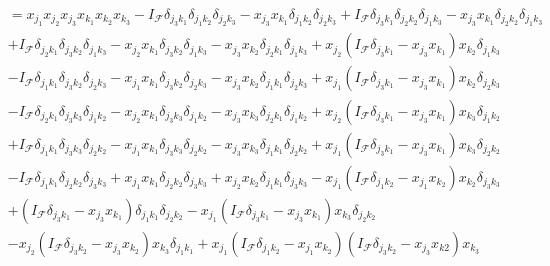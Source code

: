 \documentclass[aps,preprint]{revtex4}%
\begin{document}
\begin{align}
&  =x_{j_{1}}x_{j_{2}}x_{j_{3}}x_{k_{1}}x_{k_{2}}x_{k_{3}}-I_{\mathcal{F}%
}\delta_{j_{3}k_{1}}\delta_{j_{1}k_{2}}\delta_{j_{2}k_{3}}-x_{j_{3}}x_{k_{1}%
}\delta_{j_{1}k_{2}}\delta_{j_{2}k_{3}}+I_{\mathcal{F}}\delta_{j_{3}k_{1}%
}\delta_{j_{2}k_{2}}\delta_{j_{1}k_{3}}-x_{j_{3}}x_{k_{1}}\delta_{j_{2}k_{2}%
}\delta_{j_{1}k_{3}}\nonumber\\
&  +I_{\mathcal{F}}\delta_{j_{2}k_{1}}\delta_{j_{3}k_{2}}\delta_{j_{1}k_{3}%
}-x_{j_{2}}x_{k_{1}}\delta_{j_{3}k_{2}}\delta_{j_{1}k_{3}}-x_{j_{3}}x_{k_{2}%
}\delta_{j_{2}k_{1}}\delta_{j_{1}k_{3}}+x_{j_{2}}\left(  I_{\mathcal{F}}%
\delta_{j_{3}k_{1}}-x_{j_{3}}x_{k_{1}}\right)  x_{k_{2}}\delta_{j_{1}k_{3}%
}\nonumber\\
&  -I_{\mathcal{F}}\delta_{j_{1}k_{1}}\delta_{j_{3}k_{2}}\delta_{j_{2}k_{3}%
}-x_{j_{1}}x_{k_{1}}\delta_{j_{3}k_{2}}\delta_{j_{2}k_{3}}-x_{j_{3}}x_{k_{2}%
}\delta_{j_{1}k_{1}}\delta_{j_{2}k_{3}}+x_{j_{1}}\left(  I_{\mathcal{F}}%
\delta_{j_{3}k_{1}}-x_{j_{3}}x_{k_{1}}\right)  x_{k_{2}}\delta_{j_{2}k_{3}%
}\nonumber\\
&  -I_{\mathcal{F}}\delta_{j_{2}k_{1}}\delta_{j_{3}k_{3}}\delta_{j_{1}k_{2}%
}-x_{j_{2}}x_{k_{1}}\delta_{j_{3}k_{3}}\delta_{j_{1}k_{2}}-x_{j_{3}}x_{k_{3}%
}\delta_{j_{2}k_{1}}\delta_{j_{1}k_{2}}+x_{j_{2}}\left(  I_{\mathcal{F}}%
\delta_{j_{3}k_{1}}-x_{j_{3}}x_{k_{1}}\right)  x_{k_{3}}\delta_{j_{1}k_{2}%
}\nonumber\\
&  +I_{\mathcal{F}}\delta_{j_{1}k_{1}}\delta_{j_{3}k_{3}}\delta_{j_{2}k_{2}%
}-x_{j_{1}}x_{k_{1}}\delta_{j_{3}k_{3}}\delta_{j_{2}k_{2}}-x_{j_{3}}x_{k_{3}%
}\delta_{j_{1}k_{1}}\delta_{j_{2}k_{2}}+x_{j_{1}}\left(  I_{\mathcal{F}}%
\delta_{j_{3}k_{1}}-x_{j_{3}}x_{k_{1}}\right)  x_{k_{3}}\delta_{j_{2}k_{2}%
}\nonumber\\
&  -I_{\mathcal{F}}\delta_{j_{1}k_{1}}\delta_{j_{2}k_{2}}\delta_{j_{3}k_{3}%
}+x_{j_{1}}x_{k_{1}}\delta_{j_{2}k_{2}}\delta_{j_{3}k_{3}}+x_{j_{2}}x_{k_{2}%
}\delta_{j_{1}k_{1}}\delta_{j_{3}k_{3}}-x_{j_{1}}\left(  I_{\mathcal{F}}%
\delta_{j_{1}k_{2}}-x_{j_{1}}x_{k_{2}}\right)  x_{k_{2}}\delta_{j_{3}k_{3}%
}\nonumber\\
&  +\left(  I_{\mathcal{F}}\delta_{j_{3}k_{1}}-x_{j_{3}}x_{k_{1}}\right)
\delta_{j_{1}k_{1}}\delta_{j_{2}k_{2}}-x_{j_{1}}\left(  I_{\mathcal{F}}%
\delta_{j_{3}k_{1}}-x_{j_{3}}x_{k_{1}}\right)  x_{k_{3}}\delta_{j_{2}k_{2}%
}\nonumber\\
&  -x_{j_{2}}\left(  I_{\mathcal{F}}\delta_{j_{3}k_{2}}-x_{j_{3}}x_{k_{2}%
}\right)  x_{k_{3}}\delta_{j_{1}k_{1}}+x_{j_{1}}\left(  I_{\mathcal{F}}%
\delta_{j_{1}k_{2}}-x_{j_{1}}x_{k_{2}}\right)  \left(  I_{\mathcal{F}}%
\delta_{j_{3}k_{2}}-x_{j_{3}}x_{k2}\right)  x_{k_{3}}%
\end{align}
\end{document}
